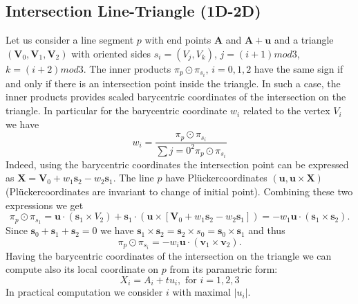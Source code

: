 \documentclass{elsarticle}
\def\vc#1{\mathbf{\boldsymbol{#1}}}     %
\newcommand{\plucker}{Pl\"{u}cker}
\begin{document}

\subsection{Intersection Line-Triangle (1D-2D)}
Let us consider a line segment $p$ with end points $\vc A$ and $\vc A + \vc u$ and a triangle $(\vc V_0, \vc V_1, \vc V_2)$ with oriented sides 
$s_i=(V_j, V_k)$, $j=(i+1) mod 3$, $k=(i+2) mod 3$. The inner products $\pi_p \odot \pi_{s_i},\, i=0,1,2$ have the same sign if and only if there
is an intersection point inside the triangle. In such a case, the inner products provides scaled barycentric coordinates of the intersection on the triangle.
In particular for the barycentric coordinate $w_i$ related to the vertex $V_i$ we have
\[
   w_i = \frac{\pi_p \odot \pi_{s_i}}{ \sum{j=0}^{2} \pi_p \odot \pi_{s_i} }
\]
Indeed, using the barycentric coordinates the intersection point can be expressed as $\vc X = \vc V_0 + w_1 \vc s_2 - w_2 \vc s_1$.
The line $p$ have \plucker coordinates $(\vc u, \vc u \times \vc X)$ (\plucker coordinates are invariant to change of initial point). Combining these two expressions we get
\[
   \pi_p \odot \pi_{s_1} = \vc u \cdot (\vc s_1 \times V_2) + \vc s_1 \cdot ( \vc u \times [\vc V_0 + w_1\vc s_2 - w_2 \vc s_1])
   =-w_1 \vc u \cdot (\vc s_1 \times \vc s_2).
\]
Since $\vc s_0 + \vc s_1 + \vc s_2=0$ we have $ \vc s_1 \times \vc s_2 = \vc s_2 \times s_0 = \vc s_0 \times \vc s_1$ and thus
\[
   \pi_p \odot \pi_{s_i} = -w_i \vc u \cdot (\vc v_1 \times \vc v_2).
\]
Having the barycentric coordinates of the intersection on the triangle we can compute also its local coordinate on $p$ from its parametric form:
\[
   X_i  = A_i + t u_i, \text{ for } i=1,2,3
\]
In practical computation we consider $i$ with maximal $|u_i|$.
\end{document}
